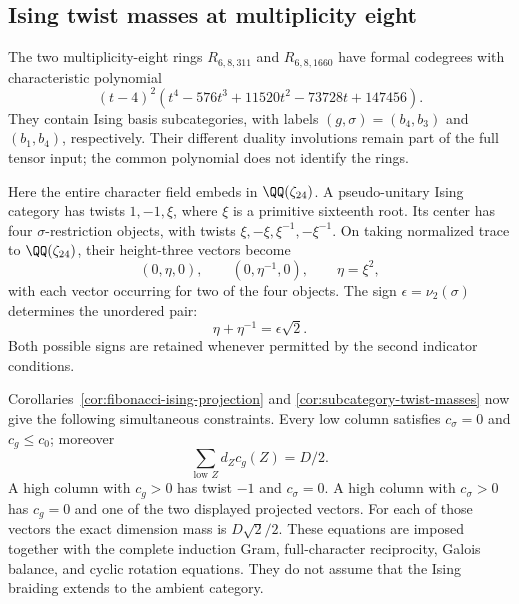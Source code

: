 \subsection{Ising twist masses at multiplicity eight}
\label{subsec:round4-m8-ising}
The two multiplicity-eight rings $R_{6,8,311}$ and $R_{6,8,1660}$ have
formal codegrees with characteristic polynomial
\[
 (t-4)^2(t^4-576t^3+11520t^2-73728t+147456).
\]
They contain Ising basis subcategories, with labels $(g,\sigma)=(b_4,b_3)$
and $(b_1,b_4)$, respectively.  Their different duality involutions
remain part of the full tensor input; the common polynomial does not
identify the rings.

Here the entire character field embeds in $\QQ(\zeta_{24})$.  A
pseudo-unitary Ising category has twists $1,-1,\xi$, where $\xi$ is a
primitive sixteenth root.  Its center has four $\sigma$-restriction
objects, with twists $\xi,-\xi,\xi^{-1},-\xi^{-1}$.  On taking normalized
trace to $\QQ(\zeta_{24})$, their height-three vectors become
\[
 (0,\eta,0),\qquad (0,\eta^{-1},0),\qquad \eta=\xi^2,
\]
with each vector occurring for two of the four objects.  The sign
$\epsilon=\nu_2(\sigma)$ determines the unordered pair:
\[
 \eta+\eta^{-1}=\epsilon\sqrt2.
\]
Both possible signs are retained whenever permitted by the second
indicator conditions.

Corollaries~\ref{cor:fibonacci-ising-projection} and
\ref{cor:subcategory-twist-masses} now give the following simultaneous
constraints.  Every low column satisfies $c_\sigma=0$ and
$c_g\leq c_0$; moreover
\[
 \sum_{\text{low }Z}d_Zc_g(Z)=D/2.
\]
A high column with $c_g>0$ has twist $-1$ and $c_\sigma=0$.
A high column with $c_\sigma>0$ has $c_g=0$ and one of the two displayed
projected vectors.  For each of those vectors the exact dimension mass
is $D\sqrt2/2$.  These equations are imposed together with the complete
induction Gram, full-character reciprocity, Galois balance, and cyclic
rotation equations.  They do not assume that the Ising braiding
extends to the ambient category.

